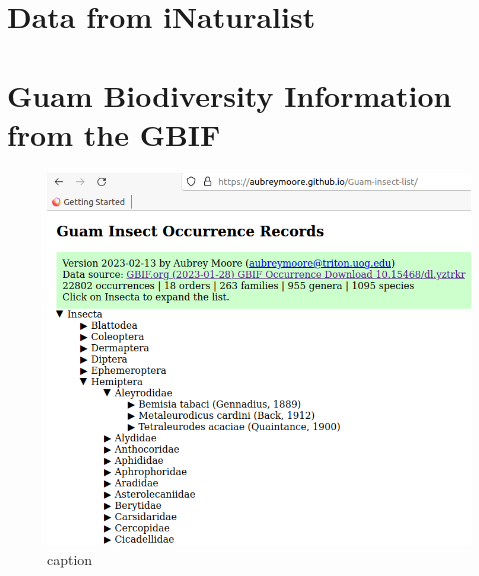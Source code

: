 \documentclass[12pt,letterpaper,english,bibliography=totocnumbered, abstract=on]{scrartcl}
\begin{document}
\section{Data from iNaturalist}

\clearpage

\section{Guam Biodiversity Information from the GBIF}

\begin{figure}[H]
	\centering
	\includegraphics[width=.7\linewidth]{images/guam-insect-occurrence-records}
	\caption{caption}
	\label{fig:guam-insect-occurrence-records}
\end{figure}

\clearpage


\end{document}
